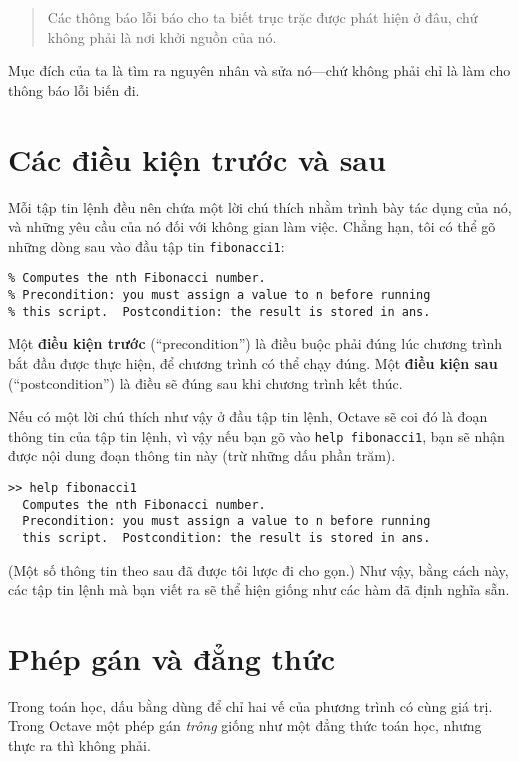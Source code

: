 \documentclass[12pt]{book}
\begin{document}
\begin{quote}
Các thông báo lỗi báo cho ta biết trục trặc được phát hiện ở đâu, chứ
không phải là nơi khởi nguồn của nó.
\end{quote}

Mục đích của ta là tìm ra nguyên nhân và sửa nó---chứ không phải 
chỉ là làm cho thông báo lỗi biến đi.


\section{Các điều kiện trước và sau}

Mỗi tập tin lệnh đều nên chứa một lời chú thích nhằm trình bày 
tác dụng của nó, và những yêu cầu của nó đối với không gian 
làm việc. Chẳng hạn, tôi có thể gõ những dòng sau vào đầu
tập tin {\tt fibonacci1}:

\begin{verbatim}
% Computes the nth Fibonacci number.  
% Precondition: you must assign a value to n before running 
% this script.  Postcondition: the result is stored in ans.
\end{verbatim}
%
Một {\bf điều kiện trước} (``precondition'') là điều buộc phải đúng
lúc chương trình bắt đầu được thực hiện, để chương trình có thể chạy đúng.
Một {\bf điều kiện sau} (``postcondition'') là điều sẽ đúng sau khi
chương trình kết thúc.

Nếu có một lời chú thích như vậy ở đầu tập tin lệnh, Octave sẽ 
coi đó là đoạn thông tin của tập tin lệnh, vì vậy nếu bạn gõ vào 
{\tt help fibonacci1}, bạn sẽ nhận được nội dung đoạn thông tin này
(trừ những dấu phần trăm).

\begin{verbatim}
>> help fibonacci1
  Computes the nth Fibonacci number.  
  Precondition: you must assign a value to n before running 
  this script.  Postcondition: the result is stored in ans.
\end{verbatim}
%
(Một số thông tin theo sau đã được tôi lược đi cho gọn.) Như vậy,
bằng cách này, các tập tin lệnh mà bạn viết ra sẽ thể hiện giống như
các hàm đã định nghĩa sẵn. %


\section{Phép gán và đẳng thức}

Trong toán học, dấu bằng dùng để chỉ hai vế của phương trình có
cùng giá trị. Trong Octave một phép gán {\em trông} giống như một
đẳng thức toán học, nhưng thực ra thì không phải.
\end{document}
